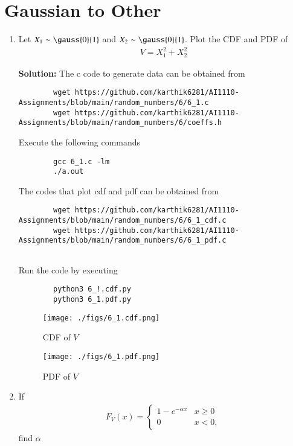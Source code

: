 \documentclass[journal,12pt,twocolumn]{IEEEtran}
\newcommand{\solution}{\noindent \textbf{Solution: }}
\numberwithin{equation}{section}
\renewcommand\thesection{\arabic{section}}
\begin{document}
	\section{Gaussian to Other}
	\begin{enumerate}[label=\thesection.\arabic*,ref=\thesection.\theenumi]
	\item Let $X_1 \sim  \gauss{0}{1}$ and $X_2 \sim  \gauss{0}{1}$. Plot the CDF and PDF of
	\begin{align}
		V = X_1^2 + X_2^2
	\end{align}
	
	\solution The c code to generate data can be obtained from
	\begin{lstlisting}
		wget https://github.com/karthik6281/AI1110-Assignments/blob/main/random_numbers/6/6_1.c
		wget https://github.com/karthik6281/AI1110-Assignments/blob/main/random_numbers/6/coeffs.h
	\end{lstlisting}
	Execute the following commands
	\begin{lstlisting}
		gcc 6_1.c -lm
		./a.out
	\end{lstlisting}
	
  The codes that plot cdf and pdf can be obtained from
	\begin{lstlisting}
		wget https://github.com/karthik6281/AI1110-Assignments/blob/main/random_numbers/6/6_1_cdf.c
		wget https://github.com/karthik6281/AI1110-Assignments/blob/main/random_numbers/6/6_1_pdf.c
		
	\end{lstlisting}
	Run the code by executing
	\begin{lstlisting}
		python3 6_!.cdf.py
		python3 6_1.pdf.py
	\end{lstlisting}
	\begin{figure}
		\centering
		\texttt{[image: ./figs/6\_1.cdf.png]}
		\caption{CDF of $V$}
		\label{fig-6.1}
	\end{figure}
	\begin{figure}
		\centering
		\texttt{[image: ./figs/6\_1.pdf.png]}
		\caption{PDF of $V$}
		\label{fig-6.2}
	\end{figure}
	
	\item If
	\begin{align}
		F_{V}(x) = 
		\begin{cases}
			1 - e^{-\alpha x} & x \geq 0 \\
			0 & x < 0,
		\end{cases}	
	\end{align}
	find $\alpha$
	

\end{enumerate}
\end{document}

